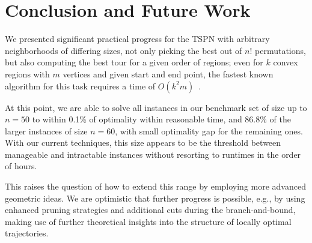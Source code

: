 \documentclass[11pt,a4paper]{article}
\theoremstyle{plain}
\begin{document}
\section{Conclusion and Future Work}

We presented significant practical progress for the TSPN with arbitrary neighborhoods of differing sizes, not only picking the best out of $n!$ permutations, but also computing the best tour for a given order of regions; even for $k$ convex regions with $m$ vertices and given start and end point, the fastest known algorithm for this task requires a time of $O(k^2 m)$~\cite{ref42}.

At this point, we are able to solve all instances in our benchmark set of size up to $n = 50$ to within 0.1\% of optimality within reasonable time, and 86.8\% of the larger instances of size $n = 60$, with small optimality gap for the remaining ones. With our current techniques, this size appears to be the threshold between manageable and intractable instances without resorting to runtimes in the order of hours.

This raises the question of how to extend this range by employing more advanced geometric ideas. We are optimistic that further progress is possible, e.g., by using enhanced pruning strategies and additional cuts during the branch-and-bound, making use of further theoretical insights into the structure of locally optimal trajectories.
\end{document}
